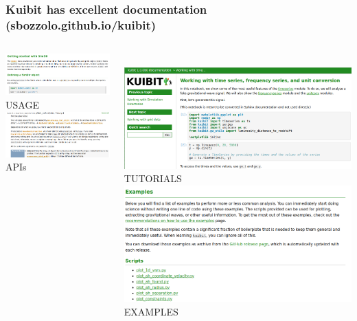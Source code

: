 \documentclass[compress, aspectratio=169]{beamer}
\begin{document}
\begin{frame}
  \frametitle{Kuibit has excellent documentation (sbozzolo.github.io/kuibit)}
  \centering
  \begin{columns}
    \begin{column}{0.5\linewidth}
      \centering
      \includegraphics[width=\columnwidth]{usage}
      {\Medium USAGE}\\[0.2cm]
      \includegraphics[width=\columnwidth]{apis}
      {\Medium APIs}
    \end{column}
    \begin{column}{0.5\linewidth}
      \centering
      \hfill \\[0.1cm]
      \includegraphics[width=\columnwidth, height=0.4\columnwidth]{tut}
      {\Medium TUTORIALS}
      \includegraphics[width=\columnwidth]{examples}
      {\Medium EXAMPLES}
    \end{column}
  \end{columns}
\end{frame}
\end{document}
